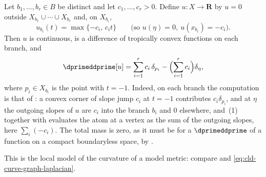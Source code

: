 \begin{example}
\label{ex:ch14-line-model-function}
Let $b_1,\ldots,b_r\in B$ be distinct and let $c_1,\ldots,c_r>0$.  Define
$u:X\to\mathbf R$ by $u=0$ outside $X_{b_1}\cup\cdots\cup X_{b_r}$ and, on
$X_{b_i}$,
\[
 u_{b_i}(t)=\max\{-c_i,\,c_it\}
 \qquad\text{(so }u(\eta)=0,\ u(x_{b_i})=-c_i).
\]
Then $u$ is continuous, is a difference of tropically convex functions on
each branch, and
\[
 \dprimeddprime[u]
 =\sum_{i=1}^rc_i\,\delta_{p_i}
   -\Bigl(\sum_{i=1}^rc_i\Bigr)\delta_\eta,
\]
where $p_i\in X_{b_i}$ is the point with $t=-1$.  Indeed, on each branch the
computation is that of : a convex corner
of slope jump $c_i$ at $t=-1$ contributes $c_i\delta_{p_i}$, and at $\eta$
the outgoing slopes of $u$ are $c_i$ into the branch $b_i$ and $0$ elsewhere,
and \,(1) together with
 evaluates the atom at a vertex as the sum of the
outgoing slopes, here $\sum_i(-c_i)$.  The total mass is zero, as it must be for a
$\dprimeddprime$ of a function on a compact boundaryless space, by
.

This is the local model of the curvature of a model metric: compare
 and \eqref{eq:cld-curve-graph-laplacian}.
\end{example}

